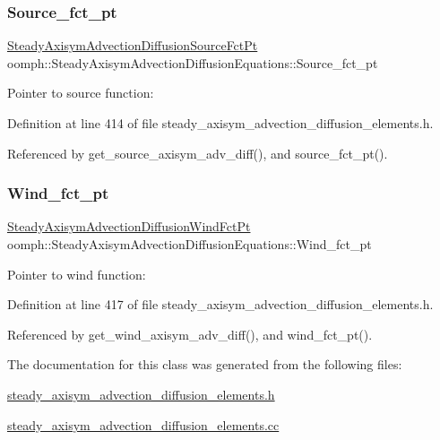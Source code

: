 \subsubsection{\texorpdfstring{Source\+\_\+fct\+\_\+pt}{Source\_fct\_pt}}
{\footnotesize\ttfamily \hyperlink{classoomph_1_1SteadyAxisymAdvectionDiffusionEquations_a1a8121ed2ce92dc69aa85c71975489d0}{Steady\+Axisym\+Advection\+Diffusion\+Source\+Fct\+Pt} oomph\+::\+Steady\+Axisym\+Advection\+Diffusion\+Equations\+::\+Source\+\_\+fct\+\_\+pt\hspace{0.3cm}{\ttfamily [protected]}}



Pointer to source function\+: 



Definition at line 414 of file steady\+\_\+axisym\+\_\+advection\+\_\+diffusion\+\_\+elements.\+h.



Referenced by get\+\_\+source\+\_\+axisym\+\_\+adv\+\_\+diff(), and source\+\_\+fct\+\_\+pt().

\mbox{\label{classoomph_1_1SteadyAxisymAdvectionDiffusionEquations_a76a3b36c6873258989b7ab6d0a54503a}} 
\subsubsection{\texorpdfstring{Wind\+\_\+fct\+\_\+pt}{Wind\_fct\_pt}}
{\footnotesize\ttfamily \hyperlink{classoomph_1_1SteadyAxisymAdvectionDiffusionEquations_af8fad98c36589cff579a35bd32641b25}{Steady\+Axisym\+Advection\+Diffusion\+Wind\+Fct\+Pt} oomph\+::\+Steady\+Axisym\+Advection\+Diffusion\+Equations\+::\+Wind\+\_\+fct\+\_\+pt\hspace{0.3cm}{\ttfamily [protected]}}



Pointer to wind function\+: 



Definition at line 417 of file steady\+\_\+axisym\+\_\+advection\+\_\+diffusion\+\_\+elements.\+h.



Referenced by get\+\_\+wind\+\_\+axisym\+\_\+adv\+\_\+diff(), and wind\+\_\+fct\+\_\+pt().



The documentation for this class was generated from the following files\+:\begin{DoxyCompactItemize}
\item 
\hyperlink{steady__axisym__advection__diffusion__elements_8h}{steady\+\_\+axisym\+\_\+advection\+\_\+diffusion\+\_\+elements.\+h}\item 
\hyperlink{steady__axisym__advection__diffusion__elements_8cc}{steady\+\_\+axisym\+\_\+advection\+\_\+diffusion\+\_\+elements.\+cc}\end{DoxyCompactItemize}
